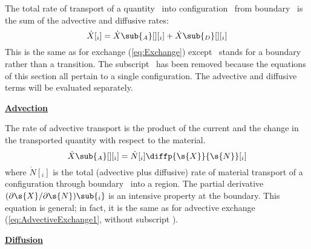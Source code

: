 The total rate of transport of a quantity~ into configuration~ from boundary~ is the sum of the advective and diffusive rates:
\begin{equation}
  \label{eq:Transport}
  \dot{X}[_i] = \dot{X}\sub{_A}[ ][_i] + \dot{X}\sub{_D}[ ][_i]
\end{equation}
This is the same as for exchange (\autoref{eq:Exchange}) except ~stands for a boundary rather than a transition.  The subscript~ has been removed because the equations of this section all pertain to a single configuration.  The advective and diffusive terms will be evaluated separately.


\noindent\underline{\textbf{Advection}}

The rate of advective transport is the product of the current and the change in the transported quantity with respect to the material.
\begin{equation}
  \label{eq:AdvectiveTransport}
  \dot{X}\sub{_A}[ ][_i] = \dot{N}[_i]\diffp{\s{X}}{\s{N}}[_i]
\end{equation}
where $\dot{N}[_i]$ is the total (advective plus diffusive) rate of material transport of a configuration through boundary~ into a region.  The partial derivative $(\partial\s{X}/\partial\s{N})\sub{_i}$ is an intensive property at the boundary.  This equation is general; in fact, it is the same as for advective exchange (\autoref{eq:AdvectiveExchange1}, without subscript ).


\noindent\underline{\textbf{Diffusion}}

